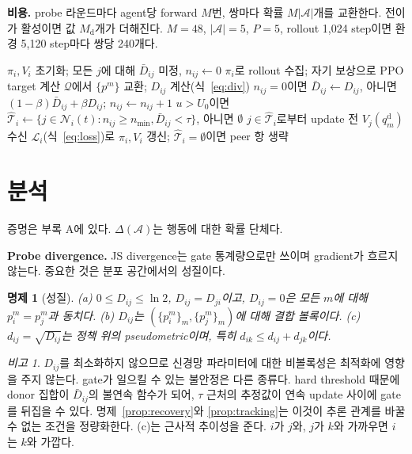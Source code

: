 \documentclass[twocolumn,10pt]{article}
\newtheorem{proposition}{명제}
\theoremstyle{remark}
\newtheorem{remark}{비고}
\newcommand{\ours}{PGCT}
\begin{document}
\textbf{비용.} probe 라운드마다 agent당 forward $M$번, 쌍마다 확률 $M|\mathcal{A}|$개를 교환한다. 전이가 활성이면 값 $M_{\mathrm{d}}$개가 더해진다. $M=48$,
$|\mathcal{A}|=5$, $P=5$, rollout 1{,}024 step이면 환경 5{,}120 step마다 쌍당 240개다.

\begin{algorithm}[t]
\caption{agent $i$의 \ours{}}
\label{alg:pgct}
\begin{algorithmic}[1]
\State $\pi_i,V_i$ 초기화; 모든 $j$에 대해 $\bar D_{ij}$ 미정, $n_{ij}\gets 0$
  \State $\pi_i$로 rollout 수집; 자기 보상으로 PPO target 계산
      \State $\mathcal{Q}$에서 $\{p^m\}$ 교환; $D_{ij}$ 계산(식~\ref{eq:div})
      \State $n_{ij}=0$이면 $\bar D_{ij}\gets D_{ij}$, 아니면 $(1-\beta)\bar D_{ij}+\beta D_{ij}$; $n_{ij}\gets n_{ij}+1$
    \EndFor
  \EndIf
  \State $u>U_0$이면 $\hat{\mathcal{T}}_i\gets\{j\in\mathcal{N}_i(t):n_{ij}\ge n_{\min},\bar D_{ij}<\tau\}$, 아니면 $\emptyset$
  \State $j\in\hat{\mathcal{T}}_i$로부터 update 전 $V_j(q^{\mathrm{d}}_m)$ 수신
  \State $\mathcal{L}_i$(식~\ref{eq:loss})로 $\pi_i,V_i$ 갱신; $\hat{\mathcal{T}}_i=\emptyset$이면 peer 항 생략
\EndFor
\end{algorithmic}
\end{algorithm}

\section{분석}
\label{sec:analysis}
증명은 부록 A에 있다. $\Delta(\mathcal{A})$는 행동에 대한 확률 단체다.

\textbf{Probe divergence.} JS divergence는 gate 통계량으로만 쓰이며 gradient가 흐르지 않는다. 중요한 것은 분포 공간에서의 성질이다.
\begin{proposition}[성질]
\label{prop:properties}
(a) $0\le D_{ij}\le\ln 2$, $D_{ij}=D_{ji}$이고, $D_{ij}=0$은 모든 $m$에 대해 $p_i^m=p_j^m$과 동치다.
(b) $D_{ij}$는 $(\{p_i^m\}_m,\{p_j^m\}_m)$에 대해 결합 볼록이다.
(c) $d_{ij}=\sqrt{D_{ij}}$는 정책 위의 pseudometric이며, 특히 $d_{ik}\le d_{ij}+d_{jk}$이다.
\end{proposition}
\begin{remark}
$D_{ij}$를 최소화하지 않으므로 신경망 파라미터에 대한 비볼록성은 최적화에 영향을 주지 않는다. gate가 일으킬 수 있는 불안정은 다른 종류다. hard threshold 때문에 donor
집합이 $\bar D_{ij}$의 불연속 함수가 되어, $\tau$ 근처의 추정값이 연속 update 사이에 gate를 뒤집을 수 있다. 명제~\ref{prop:recovery}와 \ref{prop:tracking}는 이것이 추론
관계를 바꿀 수 없는 조건을 정량화한다. (c)는 근사적 추이성을 준다. $i$가 $j$와, $j$가 $k$와 가까우면 $i$는 $k$와 가깝다.
\end{remark}
\end{document}

